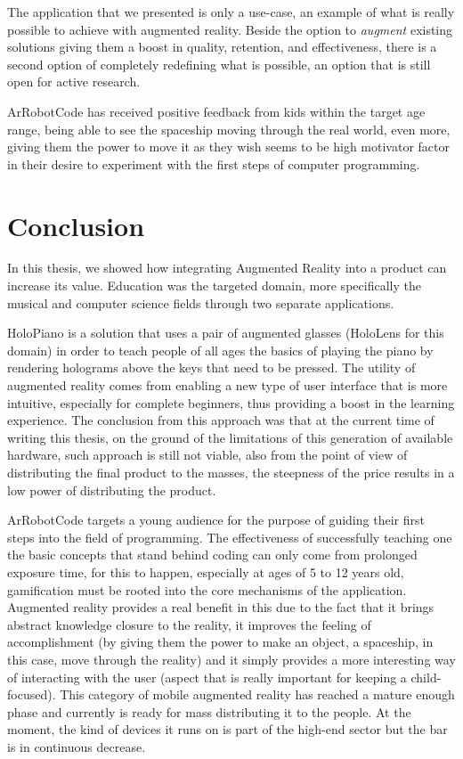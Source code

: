 \documentclass[12 pct]{report}
\begin{document}
The application that we presented is only a use-case, an example of what is really possible to achieve with augmented reality. Beside the option to \textit{augment} existing solutions giving them a boost in quality, retention, and effectiveness, there is a second option of completely redefining what is possible, an option that is still open for active research.

ArRobotCode has received positive feedback from kids within the target age range, being able to see the spaceship moving through the real world, even more, giving them the power to move it as they wish seems to be high motivator factor in their desire to experiment with the first steps of computer programming.


\chapter{Conclusion}
In this thesis, we showed how integrating Augmented Reality into a product can increase its value. Education was the targeted domain, more specifically the musical and computer science fields through two separate applications.

HoloPiano is a solution that uses a pair of augmented glasses (HoloLens for this domain) in order to teach people of all ages the basics of playing the piano by rendering holograms above the keys that need to be pressed. The utility of augmented reality comes from enabling a new type of user interface that is more intuitive, especially for complete beginners, thus providing a boost in the learning experience. The conclusion from this approach was that at the current time of writing this thesis, on the ground of the limitations of this generation of available hardware, such approach is still not viable, also from the point of view of distributing the final product to the masses, the steepness of the price results in a low power of distributing the product.

ArRobotCode targets a young audience for the purpose of guiding their first steps into the field of programming. The effectiveness of successfully teaching one the basic concepts that stand behind coding can only come from prolonged exposure time, for this to happen, especially at ages of 5 to 12 years old, gamification must be rooted into the core mechanisms of the application. Augmented reality provides a real benefit in this due to the fact that it brings abstract knowledge closure to the reality, it improves the feeling of accomplishment (by giving them the power to make an object, a spaceship, in this case, move through the reality) and it simply provides a more interesting way of interacting with the user (aspect that is really important for keeping a child-focused). This category of mobile augmented reality has reached a mature enough phase and currently is ready for mass distributing it to the people. At the moment, the kind of devices it runs on is part of the high-end sector but the bar is in continuous decrease.
\end{document}
